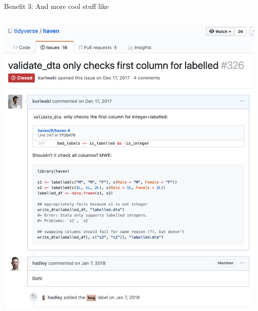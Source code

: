 \documentclass[ignorenonframetext, 10pt, aspectratio=169]{beamer}
\begin{document}
\begin{frame}{Benefit 3: And more cool stuff like}
\begin{columns}[T]
\begin{column}{0.6\textwidth}
 {\includegraphics[width = 0.7\linewidth]{file-issues.png}}
\end{column}
\end{columns}
\end{frame}
\end{document}
